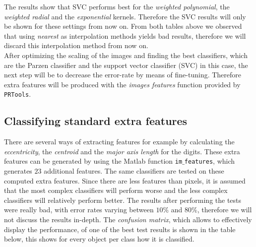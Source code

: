 \documentclass{article}
\begin{document}
The results show that SVC performs best for the \emph{weighted polynomial}, the \emph{weighted radial} and the \emph{exponential} kernels. Therefore the SVC results will only be shown for these settings from now on. From both tables above we observed that using \emph{nearest} as interpolation methods yields bad results, therefore we will discard this interpolation method from now on. \\

After optimizing the scaling of the images and finding the best classifiers, which are the Parzen classifier and the support vector classifier (SVC) in this case, the next step will be to decrease the error-rate by means of fine-tuning. Therefore extra features will be produced with the \emph{images features} function provided by \texttt{PRTools}. 

\clearpage

\subsection{Classifying standard extra features}

There are several ways of extracting features for example by calculating the \emph{eccentricity}, the \emph{centroid} and the \emph{major axis length} for the digits. These extra features can be generated by using the Matlab function \texttt{im$\_$features}, which generates $23$ additional features. The same classifiers are tested on these computed extra features. Since there are less features than pixels, it is assumed that the most complex classifiers will perform worse and the less complex classifiers will relatively perform better. The results after performing the tests were really bad, with error rates varying between $10\%$ and 80$\%$, therefore we will not discuss the results in-depth. The \emph{confusion matrix}, which allows to effectively display the performance, of one of the best test results is shown in the table below, this shows for every object per class how it is classified. 
\end{document}
